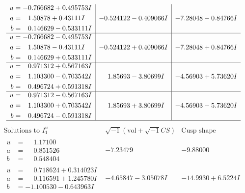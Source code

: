 \documentclass[1p]{elsarticle_modified}
\theoremstyle{definition}
\newcommand{\I}{\sqrt{-1}}
\begin{document}
$$\begin{array}{c|c|c}
\begin{aligned}
u &= -0.766682 + 0.495753 I \\
a &= \phantom{-}1.50878 + 0.43111 I \\
b &= \phantom{-}0.146629 - 0.533111 I\end{aligned}
 & -0.524122 - 0.409066 I & -7.28048 - 0.84766 I \\ \hline\begin{aligned}
u &= -0.766682 - 0.495753 I \\
a &= \phantom{-}1.50878 - 0.43111 I \\
b &= \phantom{-}0.146629 + 0.533111 I\end{aligned}
 & -0.524122 + 0.409066 I & -7.28048 + 0.84766 I \\ \hline\begin{aligned}
u &= \phantom{-}0.971312 + 0.567163 I \\
a &= \phantom{-}1.103300 - 0.703542 I \\
b &= \phantom{-}0.496724 + 0.591318 I\end{aligned}
 & \phantom{-}1.85693 - 3.80699 I & -4.56903 + 5.73620 I \\ \hline\begin{aligned}
u &= \phantom{-}0.971312 - 0.567163 I \\
a &= \phantom{-}1.103300 + 0.703542 I \\
b &= \phantom{-}0.496724 - 0.591318 I\end{aligned}
 & \phantom{-}1.85693 + 3.80699 I & -4.56903 - 5.73620 I\\
 \hline 
 \end{array}$$\newpage$$\begin{array}{c|c|c}  
\text{Solutions to }I^u_{1}& \I (\text{vol} + \sqrt{-1}CS) & \text{Cusp shape}\\
 \hline 
\begin{aligned}
u &= \phantom{-}1.17100\phantom{ +0.000000I} \\
a &= \phantom{-}0.851526\phantom{ +0.000000I} \\
b &= \phantom{-}0.548404\phantom{ +0.000000I}\end{aligned}
 & -7.23479\phantom{ +0.000000I} & -9.88000\phantom{ +0.000000I} \\ \hline\begin{aligned}
u &= \phantom{-}0.718624 + 0.314023 I \\
a &= \phantom{-}0.116591 + 1.245780 I \\
b &= -1.100530 - 0.643963 I\end{aligned}
 & -4.65847 - 3.05078 I & -14.9930 + 6.5224 I \\ \hline\begin{aligned}

\end{aligned}
\end{array}$$
\end{document}
